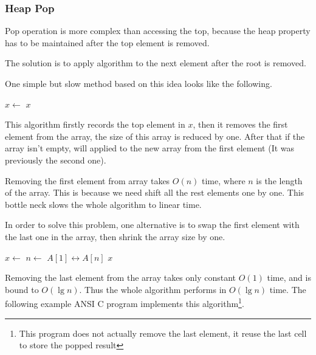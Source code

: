 \documentclass{article}
\begin{document}
\subsubsection{Heap Pop}

Pop operation is more
complex than accessing the top, because the heap property has to be maintained
after the top element is removed.

The solution is to apply  algorithm to the
next element after the root is removed.

One simple but slow method based on this idea looks like
the following.

\begin{algorithmic}[1]
  \State $x \gets$ 
  \State {}
    \State {}
  \EndIf
  \State \Return $x$
\EndFunction
\end{algorithmic}

This algorithm firstly records the top element in $x$, then
it removes the first element from the array, the size of
this array is reduced by one. After that if the array isn't
empty,  will applied to the new array from
the first element (It was previously the second one).

Removing the first element from array takes $O(n)$ time,
where $n$ is the length of the array. This is because
we need shift all the rest elements one by one.
This bottle neck slows the whole algorithm
to linear time.

In order to solve this problem, one alternative is
to swap the first element with the last one in the
array, then shrink the array size by one.

\begin{algorithmic}[1]
  \State $x \gets$ 
  \State $n \gets$ 
  \State {} $A[1] \leftrightarrow A[n]$
  \State {}
    \State {}
  \EndIf
  \State \Return $x$
\EndFunction
\end{algorithmic}

Removing the last element from the array takes
only constant $O(1)$ time, and  is bound to $O(\lg n)$.
Thus the whole algorithm performs in $O(\lg n)$ time. The following
example ANSI C program implements this algorithm\footnote{This program does not
actually remove the last element, it reuse the last cell to store the popped
result}.
\end{document}
